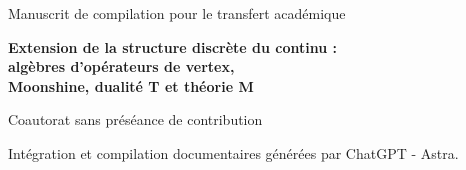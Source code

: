 \thispagestyle{plain}
\begin{center}
{\fontsize{10}{12}\selectfont Manuscrit de compilation pour le transfert académique\par}
\vspace{6mm}
{\fontsize{17}{20.5}\selectfont\bfseries
Extension de la structure discrète du continu :\\
algèbres d’opérateurs de vertex,\\
Moonshine, dualité T et théorie M\par}
\vspace{11pt}
{\fontsize{11.5}{14}\selectfont\Autores\par}
\vspace{4pt}
{\fontsize{8}{10}\selectfont Coautorat sans préséance de contribution\par}
\vspace{3pt}
{\fontsize{8}{10}\selectfont Intégration et compilation documentaires générées par ChatGPT - Astra.\par}
\end{center}
\vspace{7pt}
